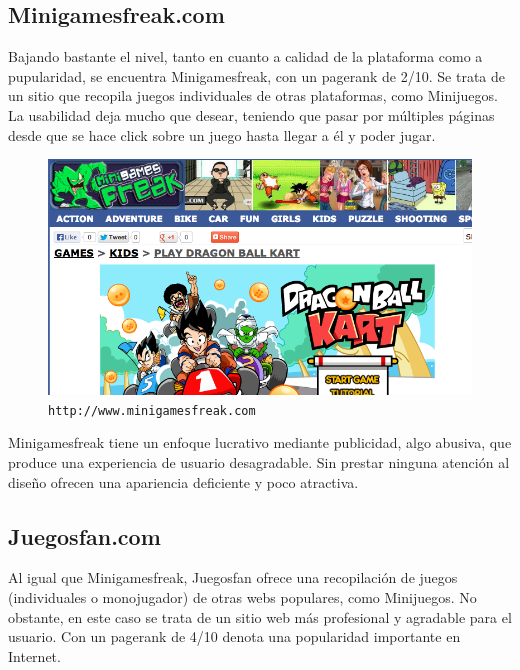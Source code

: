 \subsection*{Minigamesfreak.com}

Bajando bastante el nivel, tanto en cuanto a calidad de la plataforma como a pupularidad, se encuentra Minigamesfreak, con un pagerank de 2/10. Se trata de un sitio que recopila juegos individuales de otras plataformas, como Minijuegos. La usabilidad deja mucho que desear, teniendo que pasar por múltiples páginas desde que se hace click sobre un juego hasta llegar a él y poder jugar.

\begin{figure}[h]
  \begin{center}
    \includegraphics[width=\textwidth]{images/minigamesfreak.png}
    \caption{{\tt http://www.minigamesfreak.com}}
    \label{fig::minigamesfreak}
  \end{center}
\end{figure}

Minigamesfreak tiene un enfoque lucrativo mediante publicidad, algo abusiva, que produce una experiencia de usuario desagradable. Sin prestar ninguna atención al diseño ofrecen una apariencia deficiente y poco atractiva.

\subsection*{Juegosfan.com}

Al igual que Minigamesfreak, Juegosfan ofrece una recopilación de juegos (individuales o monojugador) de otras webs populares, como Minijuegos. No obstante, en este caso se trata de un sitio web más profesional y agradable para el usuario. Con un pagerank de 4/10 denota una popularidad importante en Internet.

